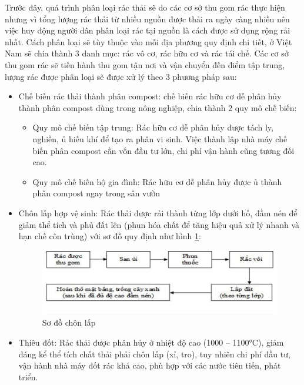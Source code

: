 
Trước đây, quá trình phân loại rác thải sẽ do các cơ sở thu gom rác thực hiện nhưng vì tổng lượng rác thải từ nhiều nguồn được thải ra ngày càng nhiều nên việc huy động người dân phân loại rác tại nguồn là cách được sử dụng rộng rải nhất. Cách phân loại sẽ tùy thuộc vào mỗi địa phương quy định chi tiết, ở Việt Nam sẽ chia thành 3 danh mục: rác vô cơ, rác hữu cơ và rác tái chế. Các cơ sở thu gom rác sẽ tiến hành thu gom tận nơi và vận chuyển đến điểm tập trung, lượng rác được phân loại sẽ được xử lý theo 3 phương pháp sau:
\begin{itemize}
    \item Chế biến rác thải thành phân compost: chế biến rác hữu cơ dễ phân hủy thành phân compost dùng trong nông nghiệp, chia thành 2 quy mô chế biến:
        \begin{itemize}
            \item Quy mô chế biến tập trung: Rác hữu cơ dễ phân hủy được tách ly, nghiền, ủ hiếu khí để tạo ra phân vi sinh. Việc thành lập nhà máy chế biến phân compost cần vốn đầu tư lớn, chi phí vận hành cũng tương đối cao.
            \item  Quy mô chế biến hộ gia đình: Rác hữu cơ dễ phân hủy được ủ thành phân compost ngay trong sân vườn
        \end{itemize}

    \item Chôn lấp hợp vệ sinh: Rác thải được rải thành từng lớp dưới hố, đầm nén để giảm thể tích và phủ đất lên (phun  hóa chất để tăng hiệu quả xử lý nhanh và hạn chế côn trùng) với sơ đồ quy định như hình \ref{fig:so_do_chon_lap}:
    
        \begin{figure}[H]
            \centering            
            \includegraphics[width=\textwidth]{images/PhanLoaiRacTruyenThong.png}
            \caption{Sơ đồ chôn lấp }
            \label{fig:so_do_chon_lap}
        \end{figure}

    \item Thiêu đốt: Rác thải được phân hủy ở nhiệt độ cao (1000 – 1100°C), giảm đáng kể thể tích chất thải phải chôn lấp (xỉ, tro), tuy nhiên chi phí đầu tư, vận hành nhà máy đốt rác khá cao, phù hợp với các nước tiên tiến, phát triển. 
   

\end{itemize}
